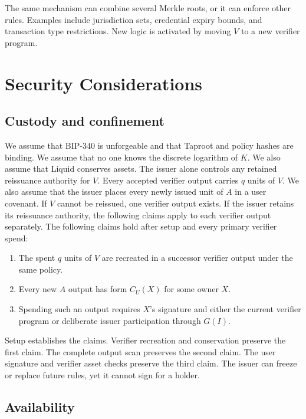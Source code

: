 \documentclass[11pt]{article}
\begin{document}
    The same mechanism can combine several Merkle roots, or it can enforce other rules.
    Examples include jurisdiction sets, credential expiry bounds, and transaction type restrictions.
    New logic is activated by moving $V$ to a new verifier program.


    \section{Security Considerations}
    \label{sec:security}

    \subsection{Custody and confinement}

    We assume that BIP-340 is unforgeable and that Taproot and policy hashes are binding.
    We assume that no one knows the discrete logarithm of $K$.
    We also assume that Liquid conserves assets.
    The issuer alone controls any retained reissuance authority for $V$.
    Every accepted verifier output carries $q$ units of $V$.
    We also assume that the issuer places every newly issued unit of $A$ in a user covenant.
    If $V$ cannot be reissued, one verifier output exists.
    If the issuer retains its reissuance authority, the following claims apply to each verifier output separately.
    The following claims hold after setup and every primary verifier spend:

    \begin{enumerate}
        \item The spent $q$ units of $V$ are recreated in a successor verifier output under the same policy.
        \item Every new $A$ output has form $C_U(X)$ for some owner $X$.
        \item Spending such an output requires $X$'s signature and either the current verifier program or deliberate issuer participation through $G(I)$.
    \end{enumerate}

    Setup establishes the claims.
    Verifier recreation and conservation preserve the first claim.
    The complete output scan preserves the second claim.
    The user signature and verifier asset checks preserve the third claim.
    The issuer can freeze or replace future rules, yet it cannot sign for a holder.

    \subsection{Availability}
\end{document}
